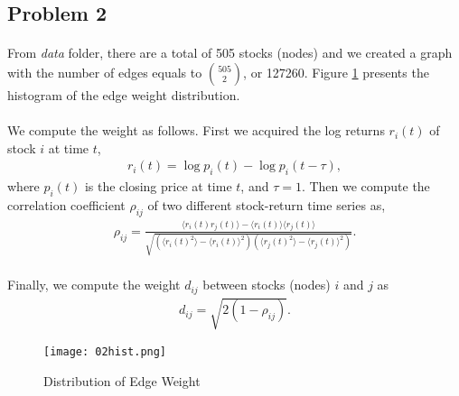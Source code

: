 \subsection*{Problem 2}
\paragraph{}
From \textit{data} folder, there are a total of 505 stocks (nodes) and we created a graph with the number of edges equals to ${505}\choose{2}$, or 127260. Figure \ref{fig:02hist} presents the histogram of the edge weight distribution.
\paragraph{}
We compute the weight as follows. First we acquired the log returns $r_i(t)$ of stock $i$ at time $t$,
\begin{align*}
r_i(t) = \log p_i(t) - \log p_i(t-\tau),
\end{align*}
where $p_i(t)$ is the closing price at time $t$, and $\tau =1 $.  Then we compute the correlation coefficient $\rho_{ij}$ of two different stock-return time series as,
\begin{align*}
\rho_{ij} = \frac{\langle r_i(t)r_j(t)\rangle - \langle r_i(t)\rangle \langle r_j(t) \rangle}
{\sqrt{(\langle r_i(t)^2\rangle - \langle r_i(t)\rangle^2)(\langle r_j(t)^2\rangle - \langle r_j(t)\rangle^2)}}.
\end{align*}
\paragraph{}
Finally, we compute the weight $d_{ij}$ between stocks (nodes) $i$ and $j$ as 
\begin{align*}
d_{ij} = \sqrt{2(1 - \rho_{ij})}.
\end{align*}


\begin{figure}[h!]
	\centering
	\texttt{[image: 02hist.png]}
	\caption{Distribution of Edge Weight}	
	\label{fig:02hist} 
\end{figure}